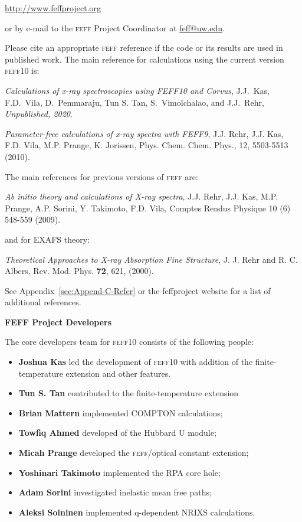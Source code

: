 \documentclass[11pt,oneside]{report} %
\newcommand{\feffcurrent}{\textsc{feff10}}
\renewcommand{\htmladdnormallink}[2]{\href{#2}{#1}}
\newcommand{\program}[1]{\textsc{#1}}
\newcommand{\feff}{\program{feff}}
\begin{document}
\begin{latexonly}
\centerline{\htmladdnormallink{http://www.feffproject.org}
  {http://www.feffproject.org}}

\noindent or by e-mail to the {\feff} Project Coordinator at
\htmladdnormallink{feff@uw.edu}{mailto:feff@uw.edu}.

Please cite an appropriate {\feff} reference if the code
or its results are used in published work. The main reference for calculations using the current version {\feffcurrent}  is:

\emph{Calculations of x-ray spectroscopies using FEFF10 and Corvus},
J.J.\ Kas, F.D.\ Vila, D.\ Pemmaraju, Tun S. Tan, S.\ Vimolchalao,
and J.J.\ Rehr, {\it Unpublished, 2020}.

\emph{Parameter-free calculations of x-ray spectra with FEFF9},
J.J. Rehr, J.J. Kas, F.D. Vila, M.P. Prange, K. Jorissen,
Phys. Chem. Chem. Phys., 12, 5503-5513 (2010).

The main references for previous versions of {\feff} are:

\emph{Ab initio theory and calculations of X-ray spectra},
 J.J. Rehr, J.J. Kas, M.P. Prange, A.P. Sorini, Y. Takimoto, F.D. Vila, Comptes Rendus Physique 10 (6) 548-559 (2009).
 
and for EXAFS theory:

\emph{Theoretical Approaches to X-ray Absorption Fine Structure},
J. J. Rehr and R. C. Albers, Rev. Mod. Phys. {\bf72}, 621, (2000).
 
See Appendix~\ref{sec:Append-C-Refer}  or the feffproject website for a list of additional references.

 
 

\medskip

{\bf FEFF Project Developers}

 The core developers team for {\feffcurrent} consists of the following people:
\begin{itemize}
\label{developers} 
\item {\bf Joshua Kas} led the development of {\feffcurrent} with addition
of the finite-temperature extension and other features.
\item {\bf Tun S. Tan} contributed to the finite-temperature extension
\item {\bf Brian Mattern} implemented COMPTON calculations;
\item {\bf Towfiq Ahmed} developed of the Hubbard U module;
\item {\bf Micah Prange} developed the {\feff}/optical constant extension; 
\item {\bf Yoshinari Takimoto} implemented the RPA core hole;
\item {\bf Adam Sorini} investigated inelastic mean free paths;
\item {\bf Aleksi Soininen} implemented q-dependent NRIXS calculations.
\end{itemize}



\end{latexonly}
\end{document}
